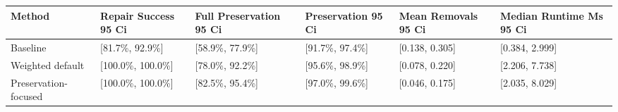 \begin{tabularx}{\linewidth}{@{}lXXXXX@{}}
\hline
Method & Repair Success 95 Ci & Full Preservation 95 Ci & Preservation 95 Ci & Mean Removals 95 Ci & Median Runtime Ms 95 Ci \\
\hline
Baseline & [81.7\%, 92.9\%] & [58.9\%, 77.9\%] & [91.7\%, 97.4\%] & [0.138, 0.305] & [0.384, 2.999] \\
Weighted default & [100.0\%, 100.0\%] & [78.0\%, 92.2\%] & [95.6\%, 98.9\%] & [0.078, 0.220] & [2.206, 7.738] \\
Preservation-focused & [100.0\%, 100.0\%] & [82.5\%, 95.4\%] & [97.0\%, 99.6\%] & [0.046, 0.175] & [2.035, 8.029] \\
\hline
\end{tabularx}
